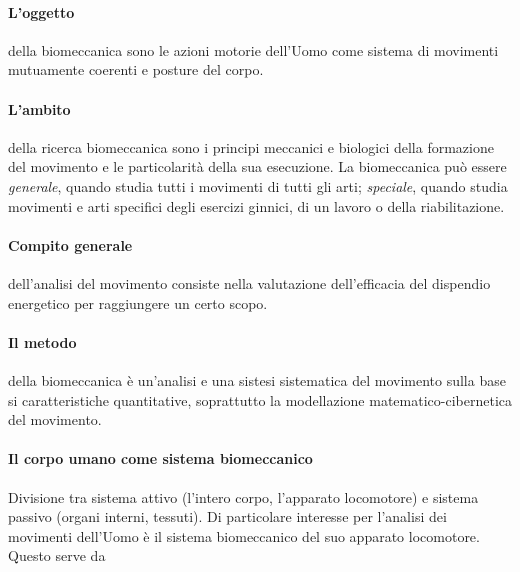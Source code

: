 \paragraph {L'oggetto} della biomeccanica sono le azioni motorie dell'Uomo come sistema
di movimenti mutuamente coerenti e posture del corpo.

\paragraph {L'ambito} della ricerca biomeccanica sono i principi meccanici e biologici
della formazione del movimento e le particolarit\`a della sua esecuzione.
La biomeccanica pu\`o essere \emph {generale}, quando studia tutti i movimenti di tutti gli arti;
\emph {speciale}, quando studia movimenti e arti specifici degli esercizi ginnici,
di un lavoro o della riabilitazione.

\paragraph {Compito generale} dell'analisi del movimento consiste nella valutazione
dell'efficacia del dispendio energetico per raggiungere un certo scopo.

% 
\paragraph {Il metodo} della biomeccanica \`e un'analisi e una sistesi sistematica
del movimento sulla base si caratteristiche quantitative,
soprattutto la modellazione matematico-cibernetica del movimento.

\paragraph {Il corpo umano come sistema biomeccanico}
Divisione tra sistema attivo (l'intero corpo, l'apparato locomotore)
e sistema passivo (organi interni, tessuti).
Di particolare interesse per l'analisi dei movimenti dell'Uomo
\`e il sistema biomeccanico del suo apparato locomotore.
Questo serve da

